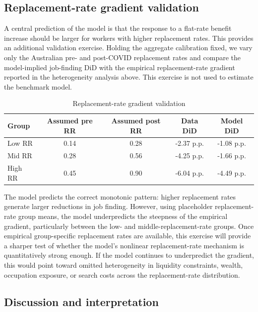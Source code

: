 \subsection{Replacement-rate gradient validation}

A central prediction of the model is that the response to a flat-rate benefit increase should be larger for workers with higher replacement rates. This provides an additional validation exercise. Holding the aggregate calibration fixed, we vary only the Australian pre- and post-COVID replacement rates and compare the model-implied job-finding DiD with the empirical replacement-rate gradient reported in the heterogeneity analysis above. This exercise is not used to estimate the benchmark model.

\begin{table}[htbp]
    \centering
    \caption{Replacement-rate gradient validation}
    \label{tab:rr_validation_14}
    \begin{tabular}{lcccc}
        \toprule
        Group & Assumed pre RR & Assumed post RR & Data DiD & Model DiD \\
        \midrule
        Low RR & 0.14 & 0.28 & -2.37 p.p. & -1.08 p.p. \\
        Mid RR & 0.28 & 0.56 & -4.25 p.p. & -1.66 p.p. \\
        High RR & 0.45 & 0.90 & -6.04 p.p. & -4.49 p.p. \\
        \bottomrule
    \end{tabular}
\end{table}

The model predicts the correct monotonic pattern: higher replacement rates generate larger reductions in job finding. However, using placeholder replacement-rate group means, the model underpredicts the steepness of the empirical gradient, particularly between the low- and middle-replacement-rate groups. Once empirical group-specific replacement rates are available, this exercise will provide a sharper test of whether the model's nonlinear replacement-rate mechanism is quantitatively strong enough. If the model continues to underpredict the gradient, this would point toward omitted heterogeneity in liquidity constraints, wealth, occupation exposure, or search costs across the replacement-rate distribution.

\subsection{Discussion and interpretation}

